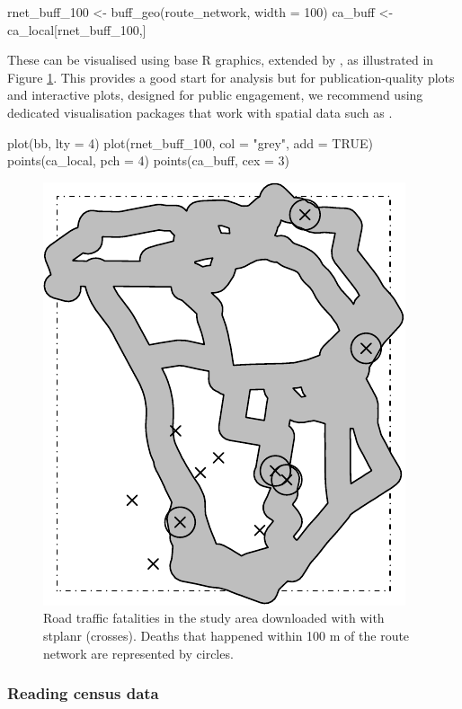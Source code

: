 \begin{Schunk}
\begin{Sinput}
rnet_buff_100 <- buff_geo(route_network, width = 100)
ca_buff <- ca_local[rnet_buff_100,]
\end{Sinput}
\end{Schunk}

These can be visualised using base R graphics, extended by ,
as illustrated in Figure \ref{fig:fats}. This provides a good start for
analysis but for publication-quality plots and interactive plots,
designed for public engagement, we recommend using dedicated
visualisation packages that work with spatial data such as
.

\begin{Schunk}
\begin{Sinput}
plot(bb, lty = 4)
plot(rnet_buff_100, col = "grey", add = TRUE)
points(ca_local, pch = 4)
points(ca_buff, cex = 3)
\end{Sinput}
\begin{figure}

{\centering \includegraphics[width=0.5\linewidth]{fats-1}

}

\caption[Road traffic fatalities in the study area downloaded with with stplanr (crosses)]{Road traffic fatalities in the study area downloaded with with stplanr (crosses). Deaths that happened within 100 m of the route network are represented by circles.}\label{fig:fats}
\end{figure}
\end{Schunk}

\subsubsection{Reading census data} \label{reading-census-data}

